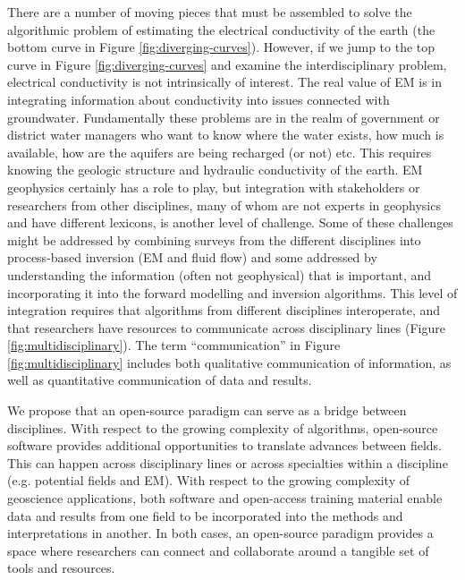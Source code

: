 \documentclass[paper]{geophysics}
\begin{document}
There are a number of moving pieces that must be assembled to solve the algorithmic problem of estimating the electrical conductivity of the earth (the bottom curve in Figure \ref{fig:diverging-curves}). However, if we jump to the top curve in Figure \ref{fig:diverging-curves} and examine the interdisciplinary problem, electrical conductivity is not intrinsically of interest. The real value of EM is in integrating information about conductivity into issues connected with groundwater. Fundamentally these problems are in the realm of government or district water managers who want to know where the water exists, how much is available, how are the aquifers are being recharged (or not) etc. This requires knowing the geologic structure and hydraulic conductivity of the earth. EM geophysics certainly has a role to play, but integration with stakeholders or researchers from other disciplines, many of whom are not experts in geophysics and have different lexicons, is another level of challenge. Some of these challenges might be addressed by combining surveys from the different disciplines into process-based inversion (EM and fluid flow) and some addressed by understanding the information (often not geophysical) that is important, and incorporating it into the forward modelling and inversion algorithms. This level of integration requires that algorithms from different disciplines interoperate, and that researchers have resources to communicate across disciplinary lines (Figure \ref{fig:multidisciplinary}). The term “communication” in Figure \ref{fig:multidisciplinary} includes both qualitative communication of information, as well as quantitative communication of data and results.

We propose that an open-source paradigm can serve as a bridge between disciplines. With respect to the growing complexity of algorithms, open-source software provides additional opportunities to translate advances between fields. This can happen across disciplinary lines or across specialties within a discipline (e.g. potential fields and EM). With respect to the growing complexity of geoscience applications, both software and open-access training material enable data and results from one field to be incorporated into the methods and interpretations in another. In both cases, an open-source paradigm provides a space where researchers can connect and collaborate around a tangible set of tools and resources.
\end{document}

